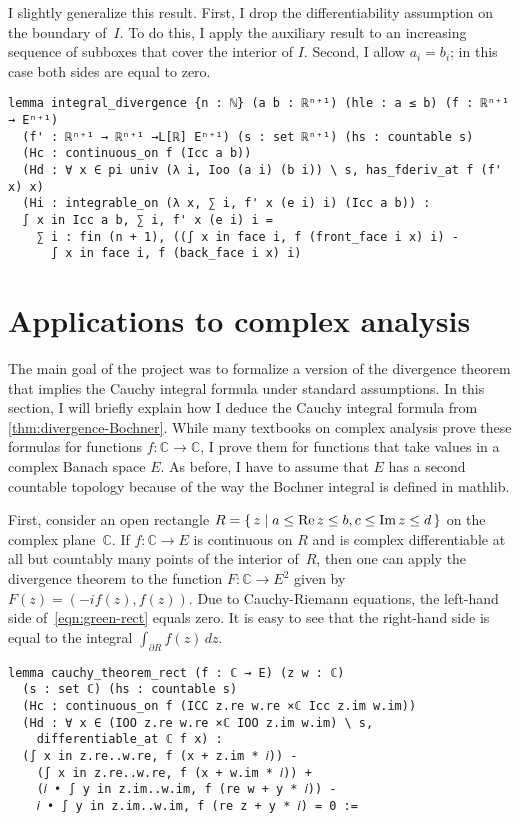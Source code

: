 \documentclass[a4paper, UKenglish,cleveref, autoref, thm-restate]{lipics-v2021}
\newcommand{\bbC}{\mathbb{C}}
\begin{document}
I slightly generalize this result. First, I drop the differentiability
assumption on the boundary of~\(I\). To do this, I apply the auxiliary
result to an increasing sequence of subboxes that cover the interior
of \(I\). Second, I allow \(a_{i}=b_{i}\); in this case both sides are
equal to zero.

\begin{lstlisting}[caption={The divergence theorem for the Bochner integral},label=lst:divergence-bochner]
lemma integral_divergence {n : ℕ} (a b : ℝⁿ⁺¹) (hle : a ≤ b) (f : ℝⁿ⁺¹ → Eⁿ⁺¹)
  (f' : ℝⁿ⁺¹ → ℝⁿ⁺¹ →L[ℝ] Eⁿ⁺¹) (s : set ℝⁿ⁺¹) (hs : countable s)
  (Hc : continuous_on f (Icc a b))
  (Hd : ∀ x ∈ pi univ (λ i, Ioo (a i) (b i)) \ s, has_fderiv_at f (f' x) x)
  (Hi : integrable_on (λ x, ∑ i, f' x (e i) i) (Icc a b)) :
  ∫ x in Icc a b, ∑ i, f' x (e i) i =
    ∑ i : fin (n + 1), ((∫ x in face i, f (front_face i x) i) -
      ∫ x in face i, f (back_face i x) i)
\end{lstlisting}

\section{Applications to complex analysis}%
\label{sec:appl-compl-analys}

The main goal of the project was to formalize a version of the
divergence theorem that implies the Cauchy integral formula under
standard assumptions. In this section, I will briefly explain how I
deduce the Cauchy integral formula from
\autoref{thm:divergence-Bochner}. While many textbooks on complex
analysis prove these formulas for functions \(f\colon \bbC\to \bbC\), I
prove them for functions that take values in a complex Banach space
\(E\). As before, I have to assume that \(E\) has a second countable
topology because of the way the Bochner integral is defined in
mathlib.

First, consider an open rectangle
\(R=\set{z|a\le \operatorname{Re}z\le b,c\le \operatorname{Im}z\le d}\) on the complex
plane~\(\bbC\). If \(f\colon \bbC\to E\) is continuous on \(R\) and is
complex differentiable at all but countably many points of the
interior of~\(R\), then one can apply the divergence theorem to the
function \(F\colon \bbC \to E^{2}\) given by \(F(z)=(-if(z),
f(z))\). Due to Cauchy-Riemann equations, the left-hand side
of~\eqref{eqn:green-rect} equals zero. It is easy to see that the
right-hand side is equal to the integral
\(\int_{\partial R}f(z)\,dz\).

\begin{lstlisting}[caption={The Cauchy-Goursat theorem for a rectangle},label=lst:cauchy-rect]
lemma cauchy_theorem_rect (f : ℂ → E) (z w : ℂ)
  (s : set ℂ) (hs : countable s)
  (Hc : continuous_on f (ICC z.re w.re ×ℂ Icc z.im w.im))
  (Hd : ∀ x ∈ (IOO z.re w.re ×ℂ IOO z.im w.im) \ s,
    differentiable_at ℂ f x) :
  (∫ x in z.re..w.re, f (x + z.im * 𝑖)) -
    (∫ x in z.re..w.re, f (x + w.im * 𝑖)) +
    (𝑖 • ∫ y in z.im..w.im, f (re w + y * 𝑖)) -
    𝑖 • ∫ y in z.im..w.im, f (re z + y * 𝑖) = 0 :=
\end{lstlisting}
\end{document}
